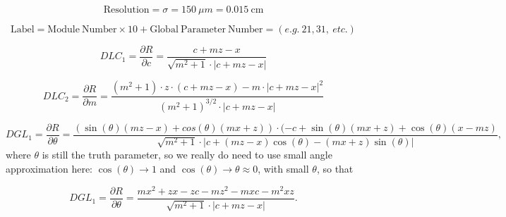 \documentclass[a4paper,11pt]{article}
\begin{document}
\begin{equation}	
\mathrm{Resolution} = \sigma = 150 \ \mu m = 0.015 \ \mathrm{cm}
\end{equation}

\begin{equation}	
\mathrm{Label}= \mathrm{Module \ Number} \times 10 + \mathrm{Global \ Parameter \ Number} = (e.g. \ 21, 31, \ etc.) 
\end{equation}

\begin{equation}
DLC_1 = \frac{\partial R}{\partial c} = \frac{ c+mz-x }  { \sqrt{m^2+1} \cdot |c+mz-x| }
\end{equation}

\begin{equation}
DLC_2 = \frac{ \partial R}{\partial m} = \frac{ (m^2+1)\cdot z\cdot(c+mz-x) - m\cdot |c+mz-x|^2 }{ (m^2+1)^{3/2} \cdot |c+mz-x|  }
\end{equation}

\begin{equation}	
DGL_1 = \frac{\partial R}{\partial\theta} = \frac{(\sin(\theta)(mz-x)+cos(\theta)(mx+z)) \cdot (-c+\sin(\theta)(mx+z)+\cos(\theta)(x-mz)}{\sqrt{m^2+1} \cdot |c+(mz-x)\cos(\theta) - (mx+z)\sin(\theta)|},
\end{equation}
where $\theta$ is still the truth parameter, so we really do need to use small angle approximation here: $\cos(\theta) \rightarrow 1$ and $\cos(\theta) \rightarrow \theta \approx 0$, with small $\theta$, so that 

\begin{equation}	
DGL_1 = \frac{\partial R}{\partial\theta} = \frac{mx^2+zx-zc-mz^2-mxc-m^2xz}{\sqrt{m^2+1} \cdot |c+mz-x|}.
\end{equation}



\nocite{*}
\thispagestyle{plain}
%
\end{document}
